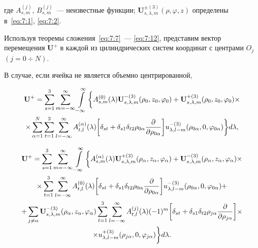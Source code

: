 \noindent где $A_{s,m}^{(j)}$, $B_{s,m}^{(j)}$~--- неизвестные функции; $\mathbf{U}_{s,\lambda,m}^{\pm(3)}(\rho,\varphi,z)$ определены в~\eqref{eq:7:1}, \eqref{eq:7:2}.

Используя теоремы сложения~\eqref{eq:7:7}~--- \eqref{eq:7:12}, представим вектор перемещения $\mathbf{U}^+$ в каждой из цилиндрических систем координат с центрами $O_j$ $(j=0\div N)$.

В случае, если ячейка не является объемно центрированной,
	
\begin{multline}
{{\bf{U}}^ + } = \sum\limits_{s = 1}^3 {\sum\limits_{m =  - \infty }^\infty  {\int\limits_{ - \infty }^\infty  \bigg\{  } } A_{s,m}^{(0)}(\lambda ){\bf{U}}_{s,\lambda ,m}^{ - (3)}({\rho _0},{z_0},{\varphi _0}) + {\bf{U}}_{s,\lambda ,m}^{ + (3)}({\rho _0},{z_0},{\varphi _0}) \times \\
\times \sum\limits_{\alpha  = 1}^N {\sum\limits_{t = 1}^3 {\sum\limits_{l =  - \infty }^\infty  {A_{t,l}^{(\alpha )}} } } (\lambda )\bigg[{\delta _{st}} + {\delta _{s1}}{\delta _{t2}}{\rho _{0\alpha }}\frac{\partial }{{\partial {\rho _{0\alpha }}}}\bigg]u_{\lambda ,l - m}^{ - (3)}({\rho _{0\alpha }},0,{\varphi _{0\alpha }})\bigg\} d\lambda,
\label{eq:7:28}
\end{multline}

\begin{multline}
{{\bf{U}}^ + } = \sum\limits_{s = 1}^3 {\sum\limits_{m =  - \infty }^\infty  {\int\limits_{ - \infty }^\infty  \bigg\{  } } A_{s,m}^{(\alpha )}(\lambda ){\bf{U}}_{s,\lambda ,m}^{ + (3)}({\rho _\alpha },{z_\alpha },{\varphi _\alpha }) + {\bf{U}}_{s,\lambda ,m}^{ - (3)}({\rho _\alpha },{z_\alpha },{\varphi _\alpha }) \times \\
\times \sum\limits_{t = 1}^3 {\sum\limits_{l =  - \infty }^\infty  {A_{t,l}^{(0)}} } (\lambda )\bigg[{\delta _{st}} + {\delta _{s1}}{\delta _{t2}}{\rho _{0\alpha }}\frac{\partial }{{\partial {\rho _{0\alpha }}}}\bigg]u_{\lambda ,l - m}^{ - (3)}({\rho _{0\alpha }},0,{\varphi _{0\alpha }}) + \\
+ \sum\limits_{j \ne \alpha } {{\bf{U}}_{s,\lambda ,m}^{ - (3)}} ({\rho _\alpha },{z_\alpha },{\varphi _\alpha })\sum\limits_{t = 1}^3 {\sum\limits_{l =  - \infty }^\infty  {A_{t,l}^{(j)}} } (\lambda ){( - 1)^m}\bigg[{\delta _{st}} + {\delta _{s1}}{\delta _{t2}}{\rho _{j\alpha }}\frac{\partial }{{\partial {\rho _{j\alpha }}}}\bigg] \times \\
\times u_{\lambda ,l - m}^{ + (3)}({\rho _{j\alpha }},0,{\varphi _{j\alpha }})\bigg\} d\lambda.
\label{eq:7:29}
\end{multline}

